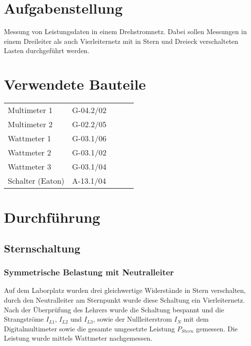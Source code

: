 \documentclass[11pt,a4paper,fleqn]{scrartcl}
\begin{document}
	\indextrue    %
	\Titelseite
	\ifindex\else\tableofcontents\newpage\fi

	\section{Aufgabenstellung}

	Messung von Leistungsdaten in einem Drehstromnetz. Dabei sollen Messungen in einem Dreileiter als auch Vierleiternetz mit in Stern und Dreieck verschalteten Lasten durchgeführt werden.

	\section{Verwendete Bauteile}
	\begin{table}[h!]
		\begin{tabular}{|l|l|lll}
			\cline{1-2}
			Multimeter   1     & G-04.2/02 &  &  &  \\ \cline{1-2}
			Multimeter   2     & G-02.2/05 &  &  &  \\ \cline{1-2}
			Wattmeter 1        & G-03.1/06 &  &  &  \\ \cline{1-2}
			Wattmeter 2        & G-03.1/02 &  &  &  \\ \cline{1-2}
			Wattmeter 3        & G-03.1/04 &  &  &  \\ \cline{1-2}
			Schalter   (Eaton) & A-13.1/04 &  &  &  \\ \cline{1-2}
		\end{tabular}
		\label{tab:Bauteile}
	\end{table}

	\section{Durchführung}

	\subsection{Sternschaltung}

	\subsubsection{Symmetrische Belastung mit Neutralleiter}

	Auf dem Laborplatz wurden drei gleichwertige Widerstände in Stern verschalten, durch den Neutralleiter am Sternpunkt wurde diese Schaltung ein Vierleiternetz.
	Nach der Überprüfung des Lehrers wurde die Schaltung bespannt und die Strangströme $I_{L1}$, $I_{L2}$ und $I_{L3}$, sowie der Nullleiterstrom $I_{N}$ mit dem Digitalmultimeter sowie die gesamte umgesetzte Leistung $P_{Stern}$ gemessen. Die Leistung wurde mittels Wattmeter nachgemessen.
\end{document}
